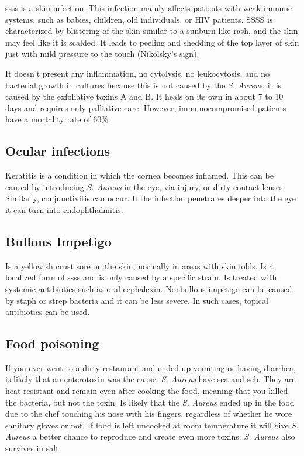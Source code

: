 \gls{ssss} is a skin infection. This infection mainly affects patients with weak immune systems, such as babies, children, old individuals, or HIV patients. SSSS is characterized by blistering of the skin similar to a sunburn-like rash, and the skin may feel like it is scalded. It leads to peeling and shedding of the top layer of skin just with mild pressure to the touch (Nikolsky's sign).

It doesn't present any inflammation, no cytolysis, no leukocytosis, and no bacterial growth in cultures because this is not caused by the \textit{S. Aureus}, it is caused by the exfoliative toxins A and B. It heals on its own in about 7 to 10 days and requires only palliative care. However, immunocompromised patients have a mortality rate of 60\%.

\subsection{Ocular infections}

Keratitis is a condition in which the cornea becomes inflamed. This can be caused by introducing \textit{S. Aureus} in the eye, via injury, or dirty contact lenses. Similarly, conjunctivitis can occur. If the infection penetrates deeper into the eye it can turn into endophthalmitis. \cite{MURUGAN2010}

\subsection{Bullous Impetigo}

Is a yellowish crust sore on the skin, normally in areas with skin folds. Is a localized form of \gls{ssss} and is only caused by a specific strain. Is treated with systemic antibiotics such as oral cephalexin. Nonbullous impetigo can be caused by staph or strep bacteria and it can be less severe. In such cases, topical antibiotics can be used.

\subsection{Food poisoning}

If you ever went to a dirty restaurant and ended up vomiting or having diarrhea, is likely that an enterotoxin was the cause. \textit{S. Aureus} have \gls{sea} and \gls{seb}. They are heat resistant and remain even after cooking the food, meaning that you killed the bacteria, but not the toxin. Is likely that the \textit{S. Aureus} ended up in the food due to the chef touching his nose with his fingers, regardless of whether he wore sanitary gloves or not. If food is left uncooked at room temperature it will give \textit{S. Aureus} a better chance to reproduce and create even more toxins. \textit{S. Aureus} also survives in salt.

